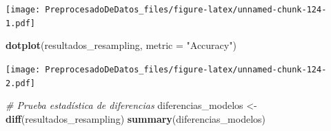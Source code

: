 \documentclass[
]{article}
\newenvironment{Shaded}{\begin{snugshade}}{\end{snugshade}}
\newcommand{\AttributeTok}[1]{\textcolor[rgb]{0.13,0.29,0.53}{#1}}
\newcommand{\CommentTok}[1]{\textcolor[rgb]{0.56,0.35,0.01}{\textit{#1}}}
\newcommand{\FunctionTok}[1]{\textcolor[rgb]{0.13,0.29,0.53}{\textbf{#1}}}
\newcommand{\NormalTok}[1]{#1}
\newcommand{\OtherTok}[1]{\textcolor[rgb]{0.56,0.35,0.01}{#1}}
\newcommand{\StringTok}[1]{\textcolor[rgb]{0.31,0.60,0.02}{#1}}
\begin{document}
\texttt{[image: PreprocesadoDeDatos\_files/figure-latex/unnamed-chunk-124-1.pdf]}

\begin{Shaded}
\begin{Highlighting}[]
\FunctionTok{dotplot}\NormalTok{(resultados\_resampling, }\AttributeTok{metric =} \StringTok{"Accuracy"}\NormalTok{)}
\end{Highlighting}
\end{Shaded}

\texttt{[image: PreprocesadoDeDatos\_files/figure-latex/unnamed-chunk-124-2.pdf]}

\begin{Shaded}
\begin{Highlighting}[]
\CommentTok{\# Prueba estadística de diferencias}
\NormalTok{diferencias\_modelos }\OtherTok{\textless{}{-}} \FunctionTok{diff}\NormalTok{(resultados\_resampling)}
\FunctionTok{summary}\NormalTok{(diferencias\_modelos)}
\end{Highlighting}
\end{Shaded}
\end{document}
